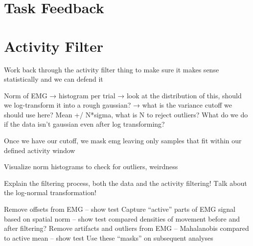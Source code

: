 \documentclass[../main.tex]{subfiles}
\begin{document}
\section[short]{Task Feedback}


\section{Activity Filter}

Work back through the activity filter thing to make sure it makes sense statistically and we can defend it

Norm of EMG → histogram per trial → look at the distribution of this, should we log-transform it into a rough gaussian? → what is the variance cutoff we should use here? Mean +/ N*sigma, what is N to reject outliers? What do we do if the data isn’t gaussian even after log transforming?

Once we have our cutoff, we mask emg leaving only samples that fit within our defined activity window

Visualize norm histograms to check for outliers, weirdness

Explain the filtering process, both the data and the activity filtering! Τalk about the log-normal transformation!

Remove offsets from EMG – show test
Capture “active” parts of EMG signal based on spatial norm – show test compared densities of movement before and after filtering?
Remove artifacts and outliers from EMG – Mahalanobis compared to active mean – show test
Use these “masks” on subsequent analyses



\end{document}
